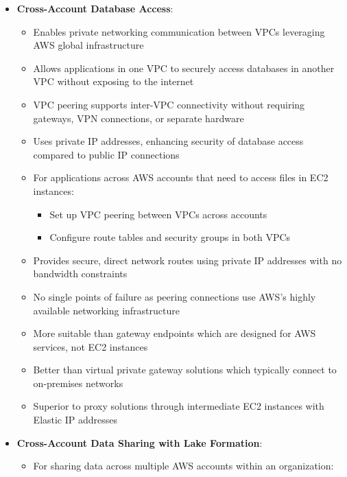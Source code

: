 \documentclass[11pt,a4paper]{report}
\begin{document}
\begin{itemize}
\begin{itemize}
  \item Superior to virtual private gateway solutions which typically for connecting to on-premises networks
  \item Better than private virtual interfaces (VIFs) which are used with Direct Connect for on-premises connectivity
\end{itemize}
  \item \textbf{Cross-Account Database Access}:
\begin{itemize}
  \item Enables private networking communication between VPCs leveraging AWS global infrastructure
  \item Allows applications in one VPC to securely access databases in another VPC without exposing to the internet
  \item VPC peering supports inter-VPC connectivity without requiring gateways, VPN connections, or separate hardware
  \item Uses private IP addresses, enhancing security of database access compared to public IP connections
  \item For applications across AWS accounts that need to access files in EC2 instances:
\begin{itemize}
  \item Set up VPC peering between VPCs across accounts
  \item Configure route tables and security groups in both VPCs
\end{itemize}
  \item Provides secure, direct network routes using private IP addresses with no bandwidth constraints
  \item No single points of failure as peering connections use AWS's highly available networking infrastructure
  \item More suitable than gateway endpoints which are designed for AWS services, not EC2 instances
  \item Better than virtual private gateway solutions which typically connect to on-premises networks
  \item Superior to proxy solutions through intermediate EC2 instances with Elastic IP addresses
\end{itemize}
  \item \textbf{Cross-Account Data Sharing with Lake Formation}:
\begin{itemize}
  \item For sharing data across multiple AWS accounts within an organization:
\begin{itemize}

\end{itemize}
\end{itemize}
\end{itemize}
\end{document}
